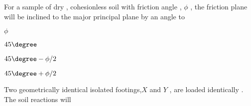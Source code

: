 \item For a sample of dry , cohesionless soil with friction angle , $\phi$ , the friction plane will be inclined to the major principal plane by an angle to  
\begin{enumerate}
\begin{multicols}{2}
\item $ \phi $
\item $ 45 \degree $
\item $ 45 \degree - \phi/2 $
\item $ 45 \degree + \phi/2 $
\end{multicols}
\end{enumerate}
\item Two geometrically identical isolated footings,$X$  and $Y$  , are loaded identically  . The soil reactions will 
